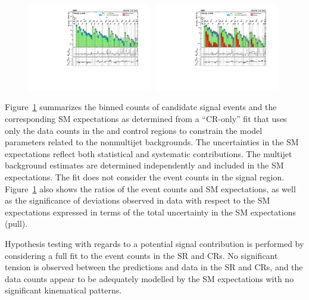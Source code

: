 \begin{figure}[!p]
  \includegraphics[width=0.48\textwidth, trim=10 0 60 10, clip=true]{Figures/5jet_cr-only.pdf}~
  \includegraphics[width=0.48\textwidth, trim=10 0 60 10, clip=true]{Figures/6jet_cr-only.pdf}\\
  \label{fig:result}
\end{figure}

Figure~\ref{fig:result} summarizes the binned counts of candidate
signal events and the corresponding SM expectations as determined from
a ``CR-only'' fit that uses only the data counts in the \mj and \mmj
control regions to constrain the model parameters related to the
nonmultijet backgrounds. The uncertainties in the SM expectations
reflect both statistical and systematic contributions. The multijet
background estimates are determined independently and included in the
SM expectations. The fit does not consider the event counts in the
signal region. Figure~\ref{fig:result} also shows the ratios of the
event counts and SM expectations, as well as the significance of
deviations observed in data with respect to the SM expectations
expressed in terms of the total uncertainty in the SM expectations
(pull).

Hypothesis testing with regards to a potential signal contribution is
performed by considering a full fit to the event counts in the SR and
CRs. 
No significant tension is observed between the predictions and data in
the SR and CRs, and the data counts appear to be adequately modelled
by the SM expectations with no significant kinematical patterns.

